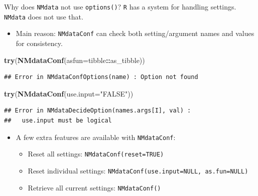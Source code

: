 \documentclass[
  8pt,
  ignorenonframetext,
  aspectratio=169]{beamer}
\newenvironment{Shaded}{\begin{snugshade}}{\end{snugshade}}
\newcommand{\DataTypeTok}[1]{\textcolor[rgb]{0.13,0.29,0.53}{#1}}
\newcommand{\KeywordTok}[1]{\textcolor[rgb]{0.13,0.29,0.53}{\textbf{#1}}}
\newcommand{\NormalTok}[1]{#1}
\newcommand{\OperatorTok}[1]{\textcolor[rgb]{0.81,0.36,0.00}{\textbf{#1}}}
\newcommand{\StringTok}[1]{\textcolor[rgb]{0.31,0.60,0.02}{#1}}
\providecommand{\tightlist}{%
  \setlength{\itemsep}{0pt}\setlength{\parskip}{0pt}}
\begin{document}
\begin{frame}[fragile]{Why does \texttt{NMdata} not use
\texttt{options()}?}
\protect\hypertarget{why-does-nmdata-not-use-options}{}
\texttt{R} has a system for handling settings. \texttt{NMdata} does not
use that.

\begin{itemize}
\tightlist
\item
  Main reason: \texttt{NMdataConf} can check both setting/argument names
  and values for consistency.
\end{itemize}

\begin{Shaded}
\begin{Highlighting}[]
\KeywordTok{try}\NormalTok{(}\KeywordTok{NMdataConf}\NormalTok{(}\DataTypeTok{asfun=}\NormalTok{tibble}\OperatorTok{::}\NormalTok{as\_tibble))}
\end{Highlighting}
\end{Shaded}

\begin{verbatim}
## Error in NMdataConfOptions(name) : Option not found
\end{verbatim}

\begin{Shaded}
\begin{Highlighting}[]
\KeywordTok{try}\NormalTok{(}\KeywordTok{NMdataConf}\NormalTok{(}\DataTypeTok{use.input=}\StringTok{"FALSE"}\NormalTok{))}
\end{Highlighting}
\end{Shaded}

\begin{verbatim}
## Error in NMdataDecideOption(names.args[I], val) : 
##   use.input must be logical
\end{verbatim}

\begin{itemize}
\tightlist
\item
  A few extra features are available with \texttt{NMdataConf}:

  \begin{itemize}
  \tightlist
  \item
    Reset all settings: \texttt{NMdataConf(reset=TRUE)}
  \item
    Reset individual settings:
    \texttt{NMdataConf(use.input=NULL,\ as.fun=NULL)}
  \item
    Retrieve all current settings: \texttt{NMdataConf()}
  \end{itemize}
\end{itemize}
\end{frame}
\end{document}
